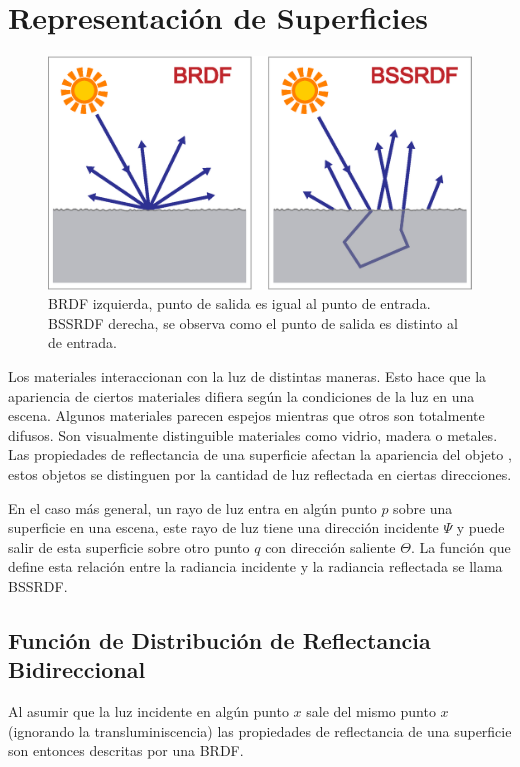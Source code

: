 \section{Representación de Superficies}
\label{sec:surface_rep}

\begin{figure}
	\includegraphics[width=\linewidth]{media/brdf_vs.eps}
	\caption
	{
    	\ac{BRDF} izquierda, punto de salida es igual al punto de entrada.\\ 
    	\ac{BSSRDF} derecha, se observa como el punto de salida es distinto al de entrada.
	}
	\label{fig:bssrdf}
\end{figure}

Los materiales interaccionan con la luz de distintas maneras. Esto hace que la apariencia de ciertos materiales difiera según la condiciones de la luz en una escena. Algunos materiales parecen espejos mientras que otros son totalmente difusos. Son visualmente distinguible materiales como vidrio, madera o metales. Las propiedades de reflectancia de una superficie afectan la apariencia del objeto \cite{advanced_gi2006}, estos objetos se distinguen por la cantidad de luz reflectada en ciertas direcciones. 

En el caso más general, un rayo de luz entra en algún punto $p$ sobre una superficie en una escena, este rayo de luz tiene una dirección incidente $\Psi$ y puede salir de esta superficie sobre otro punto $q$ con dirección saliente $\Theta$. La función que define esta relación entre la radiancia incidente y la radiancia reflectada se llama \ac{BSSRDF}.

\subsection{Función de Distribución de Reflectancia Bidireccional}
Al asumir que la luz incidente en algún punto $x$ sale del mismo punto $x$ (ignorando la transluminiscencia) las propiedades de reflectancia de una superficie son entonces descritas por una \ac{BRDF}.

